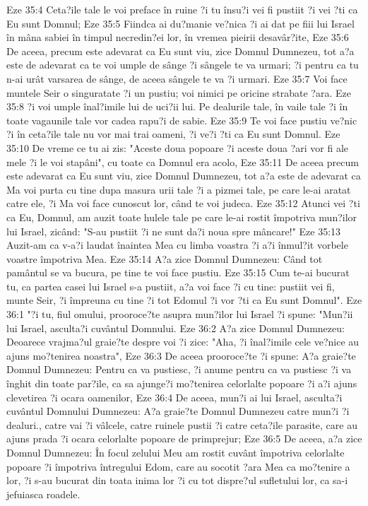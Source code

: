 Eze 35:4  Ceta?ile tale le voi preface în ruine ?i tu însu?i vei fi pustiit ?i vei ?ti ca Eu sunt Domnul;
Eze 35:5  Fiindca ai du?manie ve?nica ?i ai dat pe fiii lui Israel în mâna sabiei în timpul necredin?ei lor, în vremea pieirii desavâr?ite,
Eze 35:6  De aceea, precum este adevarat ca Eu sunt viu, zice Domnul Dumnezeu, tot a?a este de adevarat ca te voi umple de sânge ?i sângele te va urmari; ?i pentru ca tu n-ai urât varsarea de sânge, de aceea sângele te va ?i urmari.
Eze 35:7  Voi face muntele Seir o singuratate ?i un pustiu; voi nimici pe oricine strabate ?ara.
Eze 35:8  ?i voi umple înal?imile lui de uci?ii lui. Pe dealurile tale, în vaile tale ?i în toate vagaunile tale vor cadea rapu?i de sabie.
Eze 35:9  Te voi face pustiu ve?nic ?i în ceta?ile tale nu vor mai trai oameni, ?i ve?i ?ti ca Eu sunt Domnul.
Eze 35:10  De vreme ce tu ai zis: "Aceste doua popoare ?i aceste doua ?ari vor fi ale mele ?i le voi stapâni", cu toate ca Domnul era acolo,
Eze 35:11  De aceea precum este adevarat ca Eu sunt viu, zice Domnul Dumnezeu, tot a?a este de adevarat ca Ma voi purta cu tine dupa masura urii tale ?i a pizmei tale, pe care le-ai aratat catre ele, ?i Ma voi face cunoscut lor, când te voi judeca.
Eze 35:12  Atunci vei ?ti ca Eu, Domnul, am auzit toate hulele tale pe care le-ai rostit împotriva mun?ilor lui Israel, zicând: "S-au pustiit ?i ne sunt da?i noua spre mâncare!"
Eze 35:13  Auzit-am ca v-a?i laudat înaintea Mea cu limba voastra ?i a?i înmul?it vorbele voastre împotriva Mea.
Eze 35:14  A?a zice Domnul Dumnezeu: Când tot pamântul se va bucura, pe tine te voi face pustiu.
Eze 35:15  Cum te-ai bucurat tu, ca partea casei lui Israel s-a pustiit, a?a voi face ?i cu tine: pustiit vei fi, munte Seir, ?i împreuna cu tine ?i tot Edomul ?i vor ?ti ca Eu sunt Domnul".
Eze 36:1  "?i tu, fiul omului, prooroce?te asupra mun?ilor lui Israel ?i spune: "Mun?ii lui Israel, asculta?i cuvântul Domnului.
Eze 36:2  A?a zice Domnul Dumnezeu: Deoarece vrajma?ul graie?te despre voi ?i zice: "Aha, ?i înal?imile cele ve?nice au ajuns mo?tenirea noastra",
Eze 36:3  De aceea prooroce?te ?i spune: A?a graie?te Domnul Dumnezeu: Pentru ca va pustiesc, ?i anume pentru ca va pustiesc ?i va înghit din toate par?ile, ca sa ajunge?i mo?tenirea celorlalte popoare ?i a?i ajuns clevetirea ?i ocara oamenilor,
Eze 36:4  De aceea, mun?i ai lui Israel, asculta?i cuvântul Domnului Dumnezeu: A?a graie?te Domnul Dumnezeu catre mun?i ?i dealuri., catre vai ?i vâlcele, catre ruinele pustii ?i catre ceta?ile parasite, care au ajuns prada ?i ocara celorlalte popoare de primprejur;
Eze 36:5  De aceea, a?a zice Domnul Dumnezeu: În focul zelului Meu am rostit cuvânt împotriva celorlalte popoare ?i împotriva întregului Edom, care au socotit ?ara Mea ca mo?tenire a lor, ?i s-au bucurat din toata inima lor ?i cu tot dispre?ul sufletului lor, ca sa-i jefuiasca roadele.
